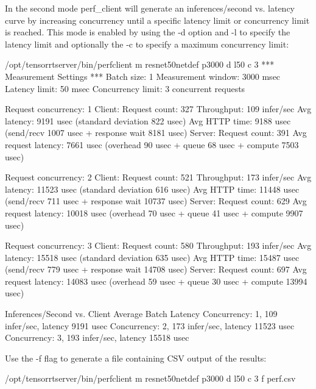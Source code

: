 \documentclass[letterpaper,10pt,english]{sphinxmanual}
\begin{document}
In the second mode perf\_client will generate an inferences/second
vs. latency curve by increasing concurrency until a specific latency
limit or concurrency limit is reached. This mode is enabled by using
the -d option and -l to specify the latency limit and optionally the
-c to specify a maximum concurrency limit:

\begin{sphinxVerbatim}[commandchars=\\\{\}]
\PYGZdl{} /opt/tensorrtserver/bin/perf\PYGZus{}client \PYGZhy{}m resnet50\PYGZus{}netdef \PYGZhy{}p3000 \PYGZhy{}d \PYGZhy{}l50 \PYGZhy{}c 3
*** Measurement Settings ***
  Batch size: 1
  Measurement window: 3000 msec
  Latency limit: 50 msec
  Concurrency limit: 3 concurrent requests

Request concurrency: 1
  Client:
    Request count: 327
    Throughput: 109 infer/sec
    Avg latency: 9191 usec (standard deviation 822 usec)
    Avg HTTP time: 9188 usec (send/recv 1007 usec + response wait 8181 usec)
  Server:
    Request count: 391
    Avg request latency: 7661 usec (overhead 90 usec + queue 68 usec + compute 7503 usec)

Request concurrency: 2
  Client:
    Request count: 521
    Throughput: 173 infer/sec
    Avg latency: 11523 usec (standard deviation 616 usec)
    Avg HTTP time: 11448 usec (send/recv 711 usec + response wait 10737 usec)
  Server:
    Request count: 629
    Avg request latency: 10018 usec (overhead 70 usec + queue 41 usec + compute 9907 usec)

Request concurrency: 3
  Client:
    Request count: 580
    Throughput: 193 infer/sec
    Avg latency: 15518 usec (standard deviation 635 usec)
    Avg HTTP time: 15487 usec (send/recv 779 usec + response wait 14708 usec)
  Server:
    Request count: 697
    Avg request latency: 14083 usec (overhead 59 usec + queue 30 usec + compute 13994 usec)

Inferences/Second vs. Client Average Batch Latency
Concurrency: 1, 109 infer/sec, latency 9191 usec
Concurrency: 2, 173 infer/sec, latency 11523 usec
Concurrency: 3, 193 infer/sec, latency 15518 usec
\end{sphinxVerbatim}

Use the -f flag to generate a file containing CSV output of the
results:

\begin{sphinxVerbatim}[commandchars=\\\{\}]
\PYGZdl{} /opt/tensorrtserver/bin/perf\PYGZus{}client \PYGZhy{}m resnet50\PYGZus{}netdef \PYGZhy{}p3000 \PYGZhy{}d \PYGZhy{}l50 \PYGZhy{}c 3 \PYGZhy{}f perf.csv
\end{sphinxVerbatim}
\end{document}
